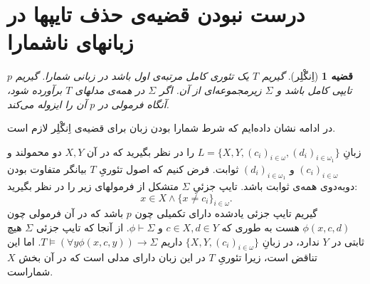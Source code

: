 \documentclass[12pt,a4paper]{article}
\theoremstyle{colorhead}
\newtheorem{thm}{قضیه}
\begin{document}
\section*{درست نبودن قضیه‌ی حذف تایپها در زبانهای ناشمارا}
\begin{thm}[اِنگْلِر]
گیریم 
$T$
یک تئوری کامل مرتبه‌ی اول باشد در زبانی شمارا. گیریم
$p$
تایپی کامل باشد و 
$\Sigma$
زیرمجموعه‌ای از آن. اگر
$\Sigma$
در همه‌ی مدلهای 
$T$
برآورده شود، آنگاه 
فرمولی در
$p$
آن را ایزوله می‌کند.
\end{thm}
در ادامه نشان داده‌ایم که شرط شمارا بودن زبان برای
قضیه‌ی اِنگْلِر لازم است.
\par 
زبانِ
$L=\{X,Y,(c_i)_{i\in \omega}, (d_i)_{i\in \omega_1}\}$
را در نظر بگیرید که در آن
$X,Y$
دو محمولند و 
$(c_i)_{i\in \omega}$
و
$(d_i)_{i\in \omega_1}$
ثوابت. 
فرض کنیم که اصول تئوریِ
$T$
بیانگر متفاوت بودن دوبه‌دوی همه‌ی ثوابت باشد. تایپ جزئیِ
$\Sigma$
متشکل از فرمولهای زیر را در نظر بگیرید:
\[
x\in X\wedge \{x\not=c_i\}_{i\in \omega}.
\]
گیریم تایپ جزئی یادشده 
دارای تکمیلی چون
$p$
باشد که در آن فرمولی چون
$\phi(x,c,d)$
هست به طوری که
$c\in X, d\in Y$
و
$\phi\vdash \Sigma$.
از آنجا که تایپ جزئی
$\Sigma$
هیچ ثابتی در
$Y$
ندارد، 
در زبانِ
$\{X,Y,(c_i)_{i\in \omega}\}$
داریم
$T\models (\forall y \phi(x,c,y))\to \Sigma$.
اما این تناقض است، زیرا تئوریِ
$T$
در این زبان دارای مدلی است که در آن
بخش
$X$
شماراست. 
\end{document}
